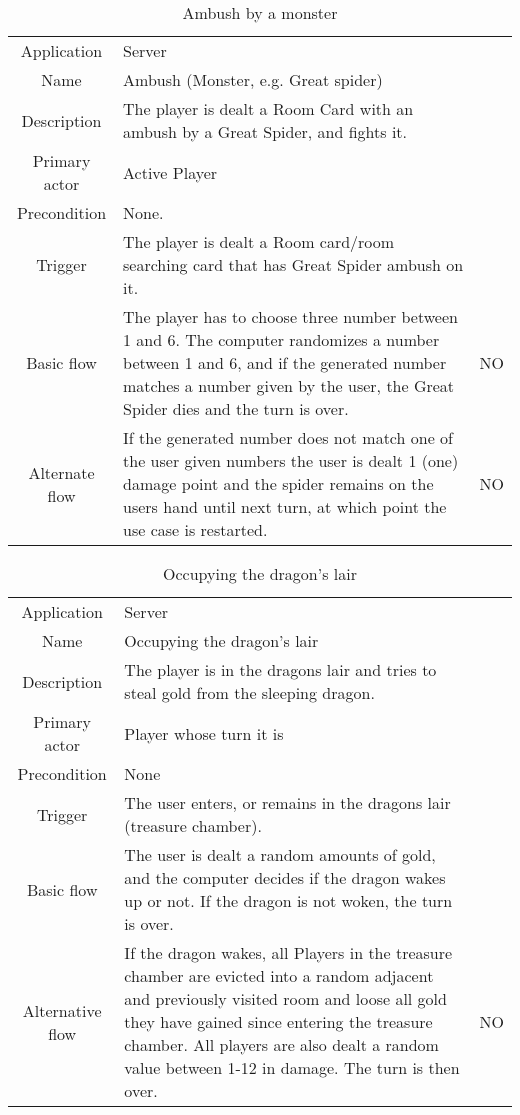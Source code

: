 \documentclass[a4paper,10pt]{report}
\begin{document}
\begin{table}
\caption{Ambush by a monster}
\label{ambushmonster}
\begin{tabular}{|c| p{9cm}|c}
\hline
Application &	Server & \\
Name & Ambush (Monster, e.g. Great spider)& \\
Description&  The player is dealt a Room Card with an ambush by a Great Spider, and fights it.& \\
Primary actor & Active Player& \\
Precondition &  None.& \\
Trigger & The player is dealt a Room card/room searching card that has Great Spider ambush on it.& \\ \hline
Basic flow & The player has to choose three number between 1 and 6. The computer randomizes a number between 1 and 6, and if the generated number matches a number given by the user, the Great Spider dies and the turn is over. & NO \\ \hline
Alternate flow & If the generated number does not match one of the user given numbers the user is dealt 1 (one) damage point and the spider remains on the users hand until next turn, at which point the use case is restarted. & NO \\
\hline
\end{tabular}
\end{table}


\begin{table}
\caption{Occupying the dragon's lair}
\label{dragonslair}
\begin{tabular}{|c| p{9cm}|c}
\hline
Application &  Server & \\
Name &  Occupying the dragon's lair & \\
Description & The player is in the dragons lair and tries to steal gold from the sleeping dragon. & \\
Primary actor&  Player whose turn it is & \\
Precondition & None & \\
Trigger & The user enters, or remains in the dragons lair (treasure chamber). & \\ \hline
Basic flow & The user is dealt a random amounts of gold, and the computer decides if the dragon wakes up or not. If the dragon is not woken, the turn is over. & \\ \hline
Alternative flow & If the dragon wakes, all Players in the treasure chamber are evicted into a random adjacent and previously visited room and loose all gold they have gained since entering the treasure chamber. All players are also dealt a random value between 1-12 in damage. The turn is then over. & NO \\
\hline
\end{tabular}
\end{table}
\end{document}
